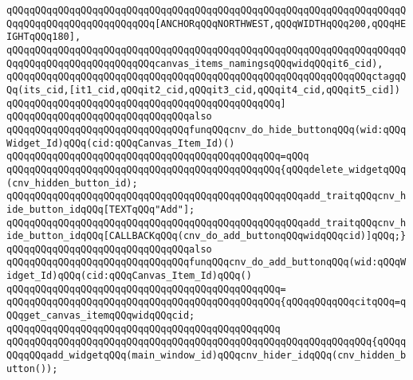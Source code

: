 \verb|qQQqqQQqqQQqqQQqqQQqqQQqqQQqqQQqqQQqqQQqqQQqqQQqqQQqqQQqqQQqqQQqqQQqqQQqqQQqqQQqqQQqqQQqqQQqqQQq[ANCHORqQQqNORTHWEST,qQQqWIDTHqQQq200,qQQqHEIGHTqQQq180],|\newline
\verb|qQQqqQQqqQQqqQQqqQQqqQQqqQQqqQQqqQQqqQQqqQQqqQQqqQQqqQQqqQQqqQQqqQQqqQQqqQQqqQQqqQQqqQQqqQQqqQQqcanvas_items_namingsqQQqwidqQQqit6_cid),|\newline
\newline
\verb|qQQqqQQqqQQqqQQqqQQqqQQqqQQqqQQqqQQqqQQqqQQqqQQqqQQqqQQqqQQqqQQqctagqQQq(its_cid,[it1_cid,qQQqit2_cid,qQQqit3_cid,qQQqit4_cid,qQQqit5_cid])|\newline
\verb|qQQqqQQqqQQqqQQqqQQqqQQqqQQqqQQqqQQqqQQqqQQqqQQq]|\newline
\newline
\newline
\newline
\verb|qQQqqQQqqQQqqQQqqQQqqQQqqQQqqQQqalso|\newline
\verb|qQQqqQQqqQQqqQQqqQQqqQQqqQQqqQQqfunqQQqcnv_do_hide_buttonqQQq(wid:qQQqWidget_Id)qQQq(cid:qQQqCanvas_Item_Id)()|\newline
\verb|qQQqqQQqqQQqqQQqqQQqqQQqqQQqqQQqqQQqqQQqqQQqqQQq=qQQq|\newline
\verb|qQQqqQQqqQQqqQQqqQQqqQQqqQQqqQQqqQQqqQQqqQQqqQQq{qQQqdelete_widgetqQQq(cnv_hidden_button_id);|\newline
\verb|qQQqqQQqqQQqqQQqqQQqqQQqqQQqqQQqqQQqqQQqqQQqqQQqqQQqadd_traitqQQqcnv_hide_button_idqQQq[TEXTqQQq"Add"];|\newline
\verb|qQQqqQQqqQQqqQQqqQQqqQQqqQQqqQQqqQQqqQQqqQQqqQQqqQQqadd_traitqQQqcnv_hide_button_idqQQq[CALLBACKqQQq(cnv_do_add_buttonqQQqwidqQQqcid)]qQQq;}|\newline
\newline
\verb|qQQqqQQqqQQqqQQqqQQqqQQqqQQqqQQqalso|\newline
\verb|qQQqqQQqqQQqqQQqqQQqqQQqqQQqqQQqfunqQQqcnv_do_add_buttonqQQq(wid:qQQqWidget_Id)qQQq(cid:qQQqCanvas_Item_Id)qQQq()|\newline
\verb|qQQqqQQqqQQqqQQqqQQqqQQqqQQqqQQqqQQqqQQqqQQqqQQq=|\newline
\verb|qQQqqQQqqQQqqQQqqQQqqQQqqQQqqQQqqQQqqQQqqQQqqQQq{qQQqqQQqqQQqcitqQQq=qQQqget_canvas_itemqQQqwidqQQqcid;|\newline
\verb|qQQqqQQqqQQqqQQqqQQqqQQqqQQqqQQqqQQqqQQqqQQqqQQq|\newline
\verb|qQQqqQQqqQQqqQQqqQQqqQQqqQQqqQQqqQQqqQQqqQQqqQQqqQQqqQQqqQQqqQQq{qQQqqQQqqQQqadd_widgetqQQq(main_window_id)qQQqcnv_hider_idqQQq(cnv_hidden_button());|\newline
